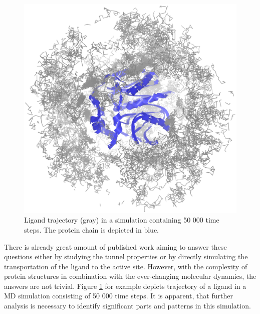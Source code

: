 \begin{figure}
\vspace{-32pt}
  \begin{center}
  \includegraphics[width=0.9\linewidth]{pictures/lig_movement.png} 
  \vspace{-10pt}
  \caption{Ligand trajectory (gray) in a simulation containing 50 000 time steps. The protein chain is depicted in blue.}
  \label{Fig:trajectory}  
  \end{center}
  \vspace{-30pt}
\end{figure} 

\vspace{10pt}
There is already great amount of published work aiming to answer these questions either by studying the tunnel properties or by directly simulating the transportation of the ligand to the active site. However, with the complexity of protein structures in combination with the ever-changing molecular dynamics, the answers are not trivial. Figure \ref{Fig:trajectory} for example depicts trajectory of a ligand in a MD simulation consisting of 50 000 time steps. It is apparent, that further analysis is necessary to identify significant parts and patterns in this simulation. 

